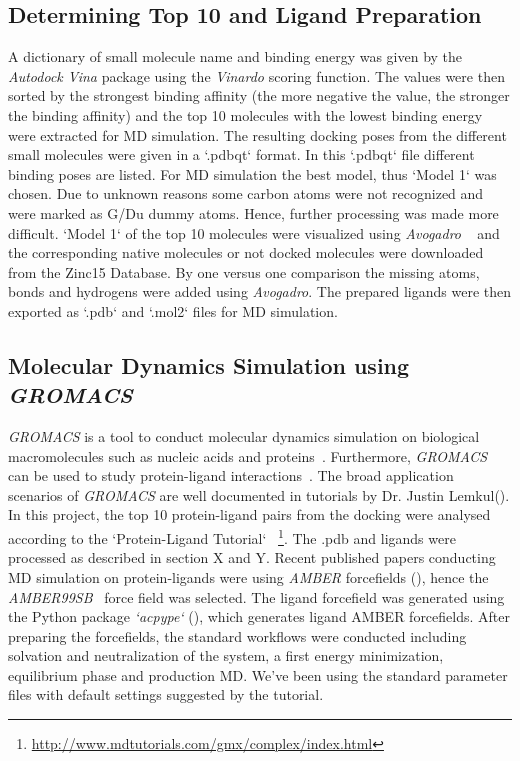 \documentclass[11pt, letterpaper, titlepage]{article}
\begin{document}
 

\subsection{Determining Top 10 and Ligand Preparation} 

 

A dictionary of small molecule name and binding energy was given by the \emph{Autodock Vina} package using the \emph{Vinardo} scoring function. The values were then sorted by the strongest binding affinity (the more negative the value, the stronger the binding affinity) and the top 10 molecules with the lowest binding energy were extracted for MD simulation.  
\newline \newline
The resulting docking poses from the different small molecules were given in a `.pdbqt` format. In this `.pdbqt` file different binding poses are listed. For MD simulation the best model, thus `Model 1` was chosen. Due to unknown reasons some carbon atoms were not recognized and were marked as G/Du dummy atoms. Hence, further processing was made more difficult. `Model 1` of the top 10 molecules were visualized using \emph{Avogadro} ~\cite{Hanwell2012AvogadroAA} and the corresponding native molecules or not docked molecules were downloaded from the Zinc15 Database. By one versus one comparison the missing atoms, bonds and hydrogens were added using \emph{Avogadro}. The prepared ligands were then exported as `.pdb` and `.mol2` files for MD simulation.  

 

\subsection{Molecular Dynamics Simulation using \emph{GROMACS}} 

 

\emph{GROMACS} is a tool to conduct molecular dynamics simulation on biological macromolecules such as nucleic acids and proteins~\cite{Bekker1993GROMACSA}. Furthermore, \emph{GROMACS} can be used to study protein-ligand interactions~\cite{authors}. The broad application scenarios of \emph{GROMACS} are well documented in tutorials by Dr. Justin Lemkul(\cite{Lemkul2019FromPT}). In this project, the top 10 protein-ligand pairs from the docking were analysed according to the `Protein-Ligand Tutorial` ~\footnote{\url{http://www.mdtutorials.com/gmx/complex/index.html}}. The .pdb and ligands were processed as described in section X and Y. Recent published papers conducting MD simulation on protein-ligands were using \emph{AMBER} forcefields (\cite{Raubenolt2022MolecularDS, Chen2022EnsembleCR}), hence the \emph{AMBER99SB}~\cite{Hornak2006ComparisonOM} force field was selected. The ligand forcefield was generated using the Python package \emph{`acpype`} (\cite{SousadaSilva2012ACPYPEA}), which generates ligand AMBER forcefields. After preparing the forcefields, the standard workflows were conducted including solvation and neutralization of the system, a first energy minimization, equilibrium phase and production MD. We’ve been using the standard parameter files with default settings suggested by the tutorial.  
\end{document}
